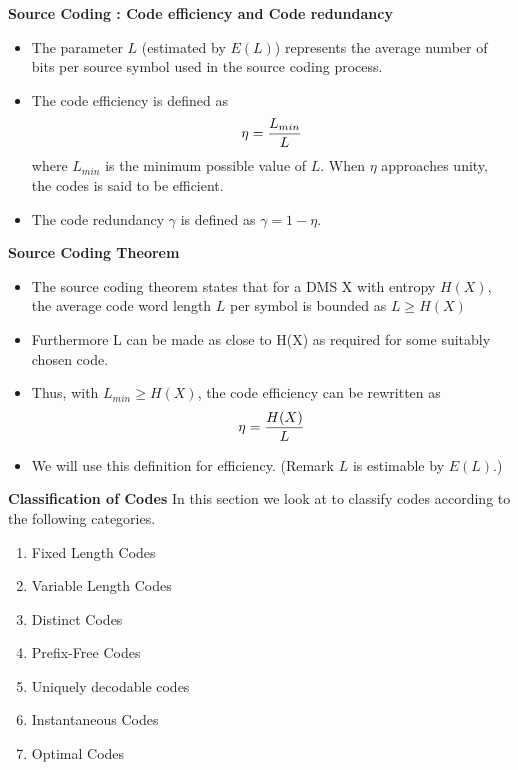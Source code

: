 \documentclass[a4]{beamer}
\begin{document}
\noindent \textbf{Source Coding : Code efficiency and Code redundancy}
\begin{itemize}
\item The parameter $L$ (estimated by $E(L)$) represents the average number of bits per source symbol used in the source coding process.\item
The code efficiency is defined as \[\eta = {L_{min} \over L} \]where $L_{min}$ is the minimum possible value of $L$. When $\eta$ approaches unity, the codes is said to be efficient.
\item The code redundancy $\gamma$ is defined as $\gamma = 1- \eta$.
\end{itemize}




\noindent \textbf{Source Coding Theorem}
\begin{itemize}
\item The source coding theorem states that for a DMS X with entropy $H(X)$, the average code word length $L$ per symbol is bounded as $L \geq H(X)$

\item Furthermore L can be made as close to H(X) as required for some suitably chosen code.
\item Thus, with $ L_{min} \geq H(X)$, the code efficiency can be rewritten as
\[\eta = {H(X) \over L} \]
\item We will use this definition for efficiency. (Remark $L$ is estimable by $E(L)$.)
\end{itemize}



\noindent \textbf{Classification of Codes}
In this section we look at to classify codes according to the following categories.
\begin{enumerate}
\item Fixed Length Codes
\item Variable Length Codes
\item Distinct Codes
\item Prefix-Free Codes
\item Uniquely decodable codes
\item Instantaneous Codes
\item Optimal Codes
\end{enumerate}
\end{document}
